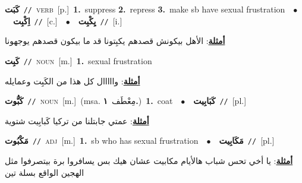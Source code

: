 \documentclass[10pt,a4paper,twoside]{article} %
\begin{document}
\begin{multicols}{2}
{\setlength\topsep{0pt}\textbf{\foreignlanguage{arabic}{كَبَت}}\ {\color{gray}\texttt{//}\color{black}}\ \textsc{verb}\ [p.]\ \textbf{1.}~suppress  \textbf{2.}~repress  \textbf{3.}~make sb have sexual frustration\ \ $\bullet$\ \ \setlength\topsep{0pt}\textbf{\foreignlanguage{arabic}{اِكْبِت}}\ {\color{gray}\texttt{//}\color{black}}\ [c.]\ \ $\bullet$\ \ \setlength\topsep{0pt}\textbf{\foreignlanguage{arabic}{يِكْبِت}}\ {\color{gray}\texttt{//}\color{black}}\ [i.]\  \begin{flushright}\color{gray}\foreignlanguage{arabic}{\textbf{\underline{\foreignlanguage{arabic}{أمثلة}}}: الأهل بيكونش قصدهم يكبِتونا قد ما بيكون قصدهم يوجهونا}\end{flushright}\color{black}} \vspace{2mm}

{\setlength\topsep{0pt}\textbf{\foreignlanguage{arabic}{كَبِت}}\ {\color{gray}\texttt{//}\color{black}}\ \textsc{noun}\ [m.]\ \textbf{1.}~sexual frustration\  \begin{flushright}\color{gray}\foreignlanguage{arabic}{\textbf{\underline{\foreignlanguage{arabic}{أمثلة}}}: وااااال كل هذا من الكَبِت وعمايله}\end{flushright}\color{black}} \vspace{2mm}

{\setlength\topsep{0pt}\textbf{\foreignlanguage{arabic}{كَبُّوت}}\ {\color{gray}\texttt{//}\color{black}}\ \textsc{noun}\ [m.]\ \color{gray}(msa. \foreignlanguage{arabic}{مِعْطَف}~\foreignlanguage{arabic}{\textbf{١.}})\color{black}\ \textbf{1.}~coat\ \ $\bullet$\ \ \setlength\topsep{0pt}\textbf{\foreignlanguage{arabic}{كَبَابِيت}}\ {\color{gray}\texttt{//}\color{black}}\ [pl.]\  \begin{flushright}\color{gray}\foreignlanguage{arabic}{\textbf{\underline{\foreignlanguage{arabic}{أمثلة}}}: عمتي جابتلنا من تركيا كَبابِيت شتوية}\end{flushright}\color{black}} \vspace{2mm}

{\setlength\topsep{0pt}\textbf{\foreignlanguage{arabic}{مَكْبُوت}}\ {\color{gray}\texttt{//}\color{black}}\ \textsc{adj}\ [m.]\ \textbf{1.}~sb who has sexual frustration\ \ $\bullet$\ \ \setlength\topsep{0pt}\textbf{\foreignlanguage{arabic}{مَكَابِيت}}\ {\color{gray}\texttt{//}\color{black}}\ [pl.]\  \begin{flushright}\color{gray}\foreignlanguage{arabic}{\textbf{\underline{\foreignlanguage{arabic}{أمثلة}}}: يا أخي تحس شباب هالأيام مكابيت عشان هيك بس يسافروا برة بيتصرفوا مثل الهجين الواقع بسلة تين}\end{flushright}\color{black}} \vspace{2mm}


\end{multicols}
\end{document}
